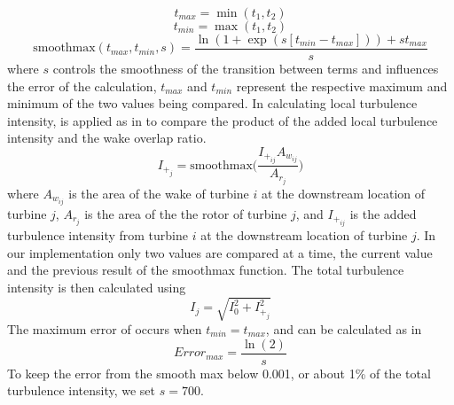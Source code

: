 \documentclass[conf]{new-aiaa}
\begin{document}
%
\begin{equation}\label{eq:smoothmax1}
    t_{max} = \min(t_1, t_2)
\end{equation}
\begin{equation}\label{eq:smoothmax2}
    t_{min} = \max(t_1, t_2)
\end{equation}
\begin{equation}\label{eq:smoothmax3}
   \text{smoothmax}(t_{max},t_{min},s) = \frac{\ln(1+\exp(s[t_{min}-t_{max}]))+s t_{max}}{s}
\end{equation}
%
where $s$ controls the smoothness of the transition between terms and influences the error of the calculation, $t_{max}$ and $t_{min}$ represent the respective maximum and minimum of the two values being compared. In calculating local turbulence intensity,  is applied as in   to compare the product of the added local turbulence intensity and the wake overlap ratio.
%
\begin{equation}\label{eq:maxti}
    I_{+_j} = \text{smoothmax}{\bigg(\frac{I_{+_{ij}}A_{w_{ij}}}{A_{r_j}}\bigg)}
\end{equation}
%
where $A_{w_{ij}}$ is the area of the wake of turbine $i$ at the downstream location of turbine $j$, $A_{r_j}$ is the area of the the rotor of turbine $j$, and $I_{+_{ij}}$ is the added turbulence intensity from turbine $i$ at the downstream location of turbine $j$. In our implementation only two values are compared at a time, the current value and the previous result of the smoothmax function. The total turbulence intensity is then calculated using 
%
\begin{equation}\label{eq:ti_at_turb}
    I_j = \sqrt{I_0^2+I_{+_j}^2}
\end{equation}
%
The maximum error of  occurs when $t_{min} = t_{max}$, and can be calculated as in 
%
\begin{equation}\label{eq:error_max}
	Error_{max} = \frac{\ln{(2)}}{s}
\end{equation}
%
To keep the error from the smooth max below 0.001, or about 1\% of the total turbulence intensity, we set $s=700$.
\end{document}
